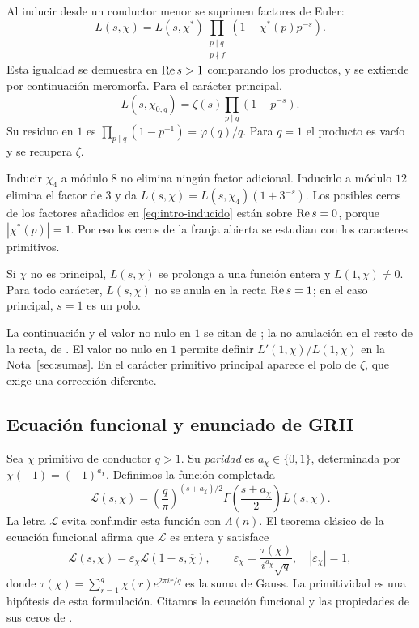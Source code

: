 Al inducir desde un conductor menor se suprimen factores de Euler:
\begin{equation}
 L(s,\chi)=L(s,\chi^*)
   \prod_{\substack{p\mid q\\p\nmid f}}(1-\chi^*(p)p^{-s}).
 \label{eq:intro-inducido}
\end{equation}
Esta igualdad se demuestra en $\operatorname{Re} s>1$ comparando los productos, y se
extiende por continuación meromorfa. Para el carácter principal,
\[
 L(s,\chi_{0,q})=\zeta(s)\prod_{p\mid q}(1-p^{-s}).
\]
Su residuo en $1$ es $\prod_{p\mid q}(1-p^{-1})=\varphi(q)/q$.
Para $q=1$ el producto es vacío y se recupera $\zeta$.

Inducir $\chi_4$ a módulo $8$ no elimina ningún factor adicional.
Inducirlo a módulo $12$ elimina el factor de $3$ y da
$L(s,\chi)=L(s,\chi_4)(1+3^{-s})$. Los posibles ceros de los factores
añadidos en \eqref{eq:intro-inducido} están sobre $\operatorname{Re} s=0$, porque
$|\chi^*(p)|=1$. Por eso los ceros de la franja abierta se estudian
con los caracteres primitivos.

\begin{teorema}
Si $\chi$ no es principal, $L(s,\chi)$ se prolonga a una función entera
y $L(1,\chi)\ne0$. Para todo carácter, $L(s,\chi)$ no se anula en la
recta $\operatorname{Re} s=1$; en el caso principal, $s=1$ es un polo.
\end{teorema}

La continuación y el valor no nulo en $1$ se citan de
\cite[§25.15, en particular (25.15.9)]{dlmf-dirichlet}; la no anulación
en el resto de la recta, de \cite[§§3.3--3.4]{kedlaya-ant}. El valor no nulo
en $1$ permite definir $L'(1,\chi)/L(1,\chi)$ en la Nota~\ref{sec:sumas}.
En el carácter primitivo principal aparece el polo de $\zeta$, que exige
una corrección diferente.

\subsection{Ecuación funcional y enunciado de GRH}

Sea $\chi$ primitivo de conductor $q>1$. Su \emph{paridad} es
$a_\chi\in\{0,1\}$, determinada por $\chi(-1)=(-1)^{a_\chi}$.
Definimos la función completada
\begin{equation}
 \mathcal L(s,\chi)=
 \left(\frac q\pi\right)^{(s+a_\chi)/2}
 \Gamma\!\left(\frac{s+a_\chi}{2}\right)L(s,\chi).
 \label{eq:intro-completada}
\end{equation}
La letra $\mathcal L$ evita confundir esta función con $\Lambda(n)$.
El teorema clásico de la ecuación funcional afirma que $\mathcal L$ es
entera y satisface
\begin{equation}
 \mathcal L(s,\chi)=\varepsilon_\chi\mathcal L(1-s,\overline\chi),
 \qquad
 \varepsilon_\chi=\frac{\tau(\chi)}{i^{a_\chi}\sqrt q},
 \quad |\varepsilon_\chi|=1,
 \label{eq:intro-fe-l}
\end{equation}
donde $\tau(\chi)=\sum_{r=1}^{q}\chi(r)e^{2\pi ir/q}$ es la suma de
Gauss. La primitividad es una hipótesis de esta formulación. Citamos la
ecuación funcional y las propiedades de sus ceros de
\cite[§25.15]{dlmf-dirichlet}.


